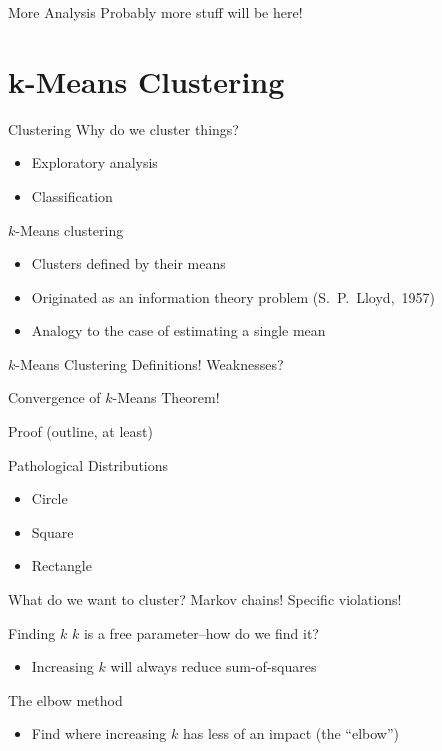 \documentclass[12pt]{beamer}
\begin{document}
\begin{frame}{More Analysis}
Probably more stuff will be here!
\end{frame}

\section{k-Means Clustering}
\begin{frame}{Clustering}
\vfill
Why do we cluster things?
\begin{itemize}
	\item Exploratory analysis
	\item Classification
\end{itemize}
\vfill
$k$-Means clustering
\begin{itemize}
	\item Clusters defined by their means
	\item Originated as an information theory problem (S.~P.~Lloyd,~1957)
	\item Analogy to the case of estimating a single mean
\end{itemize}
\vfill
\end{frame}

\begin{frame}{$k$-Means Clustering}
Definitions!
Weaknesses?
\end{frame}

\begin{frame}{Convergence of $k$-Means}
Theorem!

Proof (outline, at least)
\end{frame}

\begin{frame}{Pathological Distributions}
\begin{itemize}
	\vfill
	\item Circle
	\vfill
	\item Square
	\vfill
	\item Rectangle
	\vfill
\end{itemize}
\end{frame}

\begin{frame}{What do we want to cluster?}
Markov chains!
Specific violations!
\end{frame}

\begin{frame}{Finding $k$}
\vfill
$k$ is a free parameter--how do we find it?
\begin{itemize}
	\item Increasing $k$ will always reduce sum-of-squares
\end{itemize}
\vfill
The elbow method
\begin{itemize}
	\item Find where increasing $k$ has less of an impact (the ``elbow'')
\end{itemize}
\vfill
\end{frame}
\end{document}
